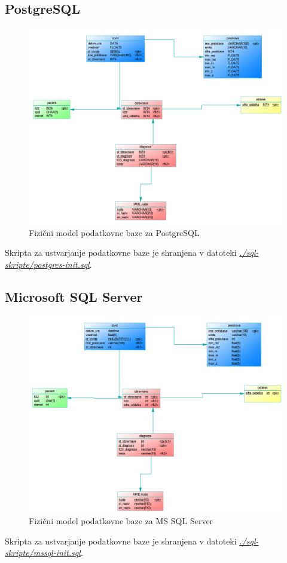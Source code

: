 \documentclass[a4paper,11pt]{report}
\begin{document}
\subsection{PostgreSQL}
\begin{figure}[htb]
   \noindent\includegraphics[width=\linewidth]{./pics/fizicni-postgres.png}
   \caption{Fizični model podatkovne baze za PostgreSQL}
\end{figure}
Skripta za ustvarjanje podatkovne baze je shranjena v datoteki \textit{\underline{./sql-skripte/postgres-init.sql}}.

\pagebreak
\subsection{Microsoft SQL Server}
\begin{figure}[htb]
   \noindent\includegraphics[width=\linewidth]{./pics/fizicni-mssql.png}
   \caption{Fizični model podatkovne baze za MS SQL Server}
\end{figure}
Skripta za ustvarjanje podatkovne baze je shranjena v datoteki \textit{\underline{./sql-skripte/mssql-init.sql}}.
\end{document}
